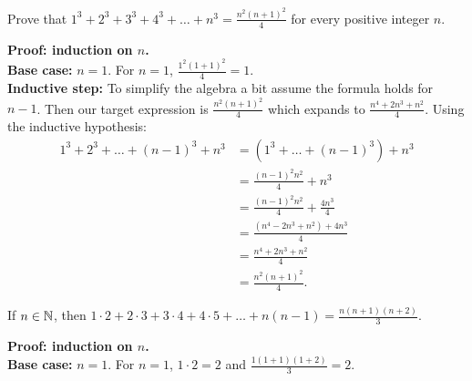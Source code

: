 \documentclass{article}
\begin{document}
\begin{problem}
Prove that $1^3 + 2^3 + 3^3 + 4^3 + \ldots + n^3 = \frac{n^2(n + 1)^2}{4}$ for every positive integer $n$.
\end{problem}

\textbf{Proof: induction on $n$.}
\\

\textbf{Base case:} $n = 1$. For $n = 1$, $\frac{1^2(1 + 1)^2}{4} = 1$.
\\

\textbf{Inductive step:} To simplify the algebra a bit assume the formula holds for $n - 1$. Then our target expression is $\frac{n^2(n+1)^2}{4}$ which expands to $\frac{n^4 + 2n^3 + n^2}{4}$. Using the inductive hypothesis:
\begin{align*}
    1^3 + 2^3 + \ldots + (n-1)^3 + n^3 & = (1^3 + \ldots + (n-1)^3) + n^3        \\
                                       & = \frac{(n-1)^2n^2}{4} + n^3            \\
                                       & = \frac{(n-1)^2n^2}{4} + \frac{4n^3}{4} \\
                                       & = \frac{(n^4 - 2n^3 + n^2) + 4n^3}{4}   \\
                                       & = \frac{n^4 + 2n^3 + n^2}{4}            \\
                                       & = \frac{n^2(n+1)^2}{4}.
\end{align*}

\begin{problem}
If $n \in \mathbb{N}$, then $1\cdot 2 + 2\cdot 3 + 3\cdot 4 + 4\cdot 5 + \ldots + n(n-1) = \frac{n(n+1)(n+2)}{3}$.
\end{problem}

\textbf{Proof: induction on $n$.}
\\

\textbf{Base case:} $n = 1$. For $n = 1$, $1\cdot 2 = 2$ and $\frac{1(1+1)(1+2)}{3} = 2$.
\\
\end{document}
